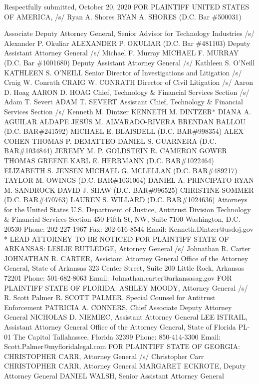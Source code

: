 \documentclass[11pt,b5paper,headings=small]{scrartcl}
\begin{document}
Respectfully submitted,
October 20, 2020
FOR PLAINTIFF UNITED STATES OF AMERICA,
/s/ Ryan A. Shores
RYAN A. SHORES (D.C. Bar \#500031)

\iffalse
Associate Deputy Attorney General,
Senior Advisor for Technology Industries
/s/ Alexander P. Okuliar
ALEXANDER P. OKULIAR (D.C. Bar \#481103)
Deputy Assistant Attorney General
/s/ Michael F. Murray
MICHAEL F. MURRAY (D.C. Bar \#1001680)
Deputy Assistant Attorney General
/s/ Kathleen S. O’Neill
KATHLEEN S. O’NEILL
Senior Director of Investigations and Litigation
/s/ Craig W. Conrath
CRAIG W. CONRATH
Director of Civil Litigation
/s/ Aaron D. Hoag
AARON D. HOAG
Chief, Technology \& Financial Services Section
/s/ Adam T. Severt
ADAM T. SEVERT
Assistant Chief, Technology \& Financial Services
Section
/s/ Kenneth M. Dintzer
KENNETH M. DINTZER*
DIANA A. AGUILAR ALDAPE
JESÚS M. ALVARADO-RIVERA
BRENDAN BALLOU (D.C. BAR\#241592)
MICHAEL E. BLAISDELL (D.C. BAR\#998354)
ALEX COHEN
THOMAS P. DEMATTEO
DANIEL S. GUARNERA (D.C. BAR\#1034844)
JEREMY M. P. GOLDSTEIN
R. CAMERON GOWER
THOMAS GREENE
KARL E. HERRMANN (D.C. BAR\#1022464)
ELIZABETH S. JENSEN
MICHAEL G. MCLELLAN (D.C. BAR\#489217)
TAYLOR M. OWINGS (D.C. BAR\#1031064)
DANIEL A. PRINCIPATO
RYAN M. SANDROCK
DAVID J. SHAW (D.C. BAR\#996525)
CHRISTINE SOMMER (D.C. BAR\#470763)
LAUREN S. WILLARD (D.C. BAR\#1024636)
Attorneys for the United States
U.S. Department of Justice, Antitrust Division
Technology \& Financial Services Section
450 Fifth St, NW, Suite 7100
Washington, D.C. 20530
Phone: 202-227-1967
Fax: 202-616-8544
Email: Kenneth.Dintzer@usdoj.gov
* LEAD ATTORNEY TO BE NOTICED
FOR PLAINTIFF STATE OF ARKANSAS:
LESLIE RUTLEDGE, Attorney General
/s/ Johnathan R. Carter
JOHNATHAN R. CARTER, Assistant Attorney General
Office of the Attorney General, State of Arkansas
323 Center Street, Suite 200
Little Rock, Arkansas 72201
Phone: 501-682-8063
Email: Johnathan.carter@arkansasag.gov
FOR PLAINTIFF STATE OF FLORIDA:
ASHLEY MOODY, Attorney General
/s/ R. Scott Palmer
R. SCOTT PALMER, Special Counsel for Antitrust Enforcement
PATRICIA A. CONNERS, Chief Associate Deputy Attorney General
NICHOLAS D. NIEMIEC, Assistant Attorney General
LEE ISTRAIL, Assistant Attorney General
Office of the Attorney General, State of Florida
PL-01 The Capitol
Tallahassee, Florida 32399
Phone: 850-414-3300
Email: Scott.Palmer@myfloridalegal.com
FOR PLAINTIFF STATE OF GEORGIA:
CHRISTOPHER CARR, Attorney General
/s/ Christopher Carr
CHRISTOPHER CARR, Attorney General
MARGARET ECKROTE, Deputy Attorney General
DANIEL WALSH, Senior Assistant Attorney General
\end{document}
